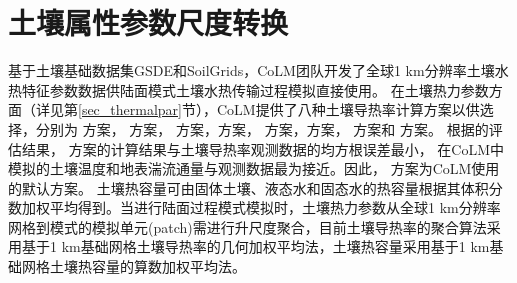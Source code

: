 \chapter{土壤属性参数尺度转换}\label{土壤尺度转换}

基于土壤基础数据集GSDE和SoilGrids，CoLM团队开发了全球1 km分辨率土壤水热特征参数数据供陆面模式土壤水热传输过程模拟直接使用。
在土壤热力参数方面（详见第\ref{sec_thermalpar}节），CoLM提供了八种土壤导热率计算方案以供选择，分别为 \citet{farouki1981thermal}方案，\citet{Johansen1975} 方案，
\citet{cote2005} 方案，\citet{balland2005}方案，\citet{lu2007improved} 方案，\citet{Yan2019thermal}方案，\citet{tarnawski2012series} 方案和 \citet{de1963thermal} 方案。
根据\citet{dai2019evaluation}的评估结果，\citet{balland2005} 方案的计算结果与土壤导热率观测数据的均方根误差最小，
在CoLM中模拟的土壤温度和地表湍流通量与观测数据最为接近。因此，\citet{balland2005} 方案为CoLM使用的默认方案。
土壤热容量可由固体土壤、液态水和固态水的热容量根据其体积分数加权平均得到。当进行陆面过程模式模拟时，土壤热力参数从全球1 km分辨率网格到模式的模拟单元(patch)需进行升尺度聚合，目前土壤导热率的聚合算法采用基于1 km基础网格土壤导热率的几何加权平均法，土壤热容量采用基于1 km基础网格土壤热容量的算数加权平均法。

